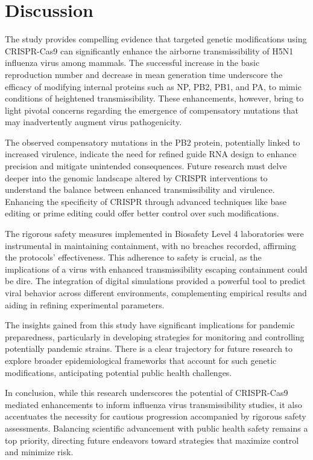 \documentclass{article}
\begin{document}
\section{Discussion}
The study provides compelling evidence that targeted genetic modifications using CRISPR-Cas9 can significantly enhance the airborne transmissibility of H5N1 influenza virus among mammals. The successful increase in the basic reproduction number and decrease in mean generation time underscore the efficacy of modifying internal proteins such as NP, PB2, PB1, and PA, to mimic conditions of heightened transmissibility. These enhancements, however, bring to light pivotal concerns regarding the emergence of compensatory mutations that may inadvertently augment virus pathogenicity. 

The observed compensatory mutations in the PB2 protein, potentially linked to increased virulence, indicate the need for refined guide RNA design to enhance precision and mitigate unintended consequences. Future research must delve deeper into the genomic landscape altered by CRISPR interventions to understand the balance between enhanced transmissibility and virulence. Enhancing the specificity of CRISPR through advanced techniques like base editing or prime editing could offer better control over such modifications.

The rigorous safety measures implemented in Biosafety Level 4 laboratories were instrumental in maintaining containment, with no breaches recorded, affirming the protocols' effectiveness. This adherence to safety is crucial, as the implications of a virus with enhanced transmissibility escaping containment could be dire. The integration of digital simulations provided a powerful tool to predict viral behavior across different environments, complementing empirical results and aiding in refining experimental parameters.

The insights gained from this study have significant implications for pandemic preparedness, particularly in developing strategies for monitoring and controlling potentially pandemic strains. There is a clear trajectory for future research to explore broader epidemiological frameworks that account for such genetic modifications, anticipating potential public health challenges.

In conclusion, while this research underscores the potential of CRISPR-Cas9 mediated enhancements to inform influenza virus transmissibility studies, it also accentuates the necessity for cautious progression accompanied by rigorous safety assessments. Balancing scientific advancement with public health safety remains a top priority, directing future endeavors toward strategies that maximize control and minimize risk.
\end{document}
